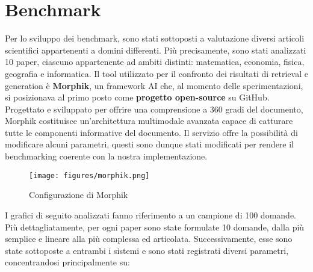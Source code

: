\section{Benchmark}
Per lo sviluppo dei benchmark, sono stati sottoposti a valutazione diversi articoli scientifici appartenenti a domini differenti. Più precisamente, sono stati analizzati 10 paper, ciascuno appartenente ad ambiti distinti: matematica, economia, fisica, geografia e informatica. Il tool utilizzato per il confronto dei risultati di retrieval e generation è \textbf{Morphik}, un framework AI che, al momento delle sperimentazioni, si posizionava al primo posto come \textbf{progetto open-source} su GitHub. Progettato e sviluppato per offrire una comprensione a 360 gradi del documento, Morphik costituisce un'architettura multimodale avanzata capace di catturare tutte le componenti informative del documento. Il servizio offre la possibilità di modificare alcuni parametri, questi sono dunque stati modificati per rendere il benchmarking coerente con la nostra implementazione.
\begin{figure}[H]
\centering
\texttt{[image: figures/morphik.png]}
\caption{Configurazione di Morphik}
\end{figure}

I grafici di seguito analizzati fanno riferimento a un campione di 100 domande. Più dettagliatamente, per ogni paper sono state formulate 10 domande, dalla più semplice e lineare alla più complessa ed articolata. Successivamente, esse sono state sottoposte a entrambi i sistemi e sono stati registrati diversi parametri, concentrandosi principalmente su:
\clearpage
